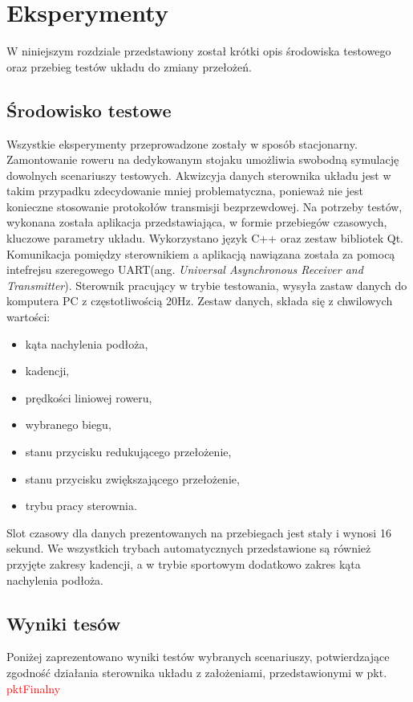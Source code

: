 \chapter{Eksperymenty}

W niniejszym rozdziale przedstawiony został krótki opis środowiska testowego oraz przebieg testów układu do zmiany przełożeń.

\section{Środowisko testowe}
Wszystkie eksperymenty przeprowadzone zostały w sposób stacjonarny. Zamontowanie roweru na dedykowanym stojaku umożliwia swobodną symulację dowolnych scenariuszy testowych. Akwizcyja danych sterownika układu jest w takim przypadku zdecydowanie mniej problematyczna, ponieważ nie jest konieczne stosowanie protokołów transmisji bezprzewdowej. 
Na potrzeby testów, wykonana została aplikacja przedstawiająca, w formie przebiegów czasowych, kluczowe parametry układu. Wykorzystano język C++ oraz zestaw bibliotek Qt. Komunikacja pomiędzy sterownikiem a aplikacją nawiązana została za pomocą intefrejsu szeregowego UART(ang. \textit{Universal Asynchronous Receiver and Transmitter}). Sterownik pracujący w trybie testowania, wysyła zastaw danych do komputera PC z częstotliwością 20Hz. Zestaw danych, składa się z chwilowych wartości:
\begin{itemize}
 \item
 kąta nachylenia podłoża,
 \item
 kadencji,
 \item
 prędkości liniowej roweru,
 \item
 wybranego biegu,
 \item
 stanu przycisku redukującego przełożenie,
 \item
 stanu przycisku zwiększającego przełożenie,
 \item
 trybu pracy sterownia.
 \end{itemize}
 
Slot czasowy dla danych prezentowanych na przebiegach jest stały i wynosi 16 sekund. We wszystkich trybach automatycznych przedstawione są również przyjęte zakresy kadencji, a w trybie sportowym dodatkowo zakres kąta nachylenia podłoża.
 
\section{Wyniki tesów}

Poniżej zaprezentowano wyniki testów wybranych scenariuszy, potwierdzające zgodność działania sterownika układu z założeniami, przedstawionymi w pkt. \textcolor{red}{pktFinalny}
